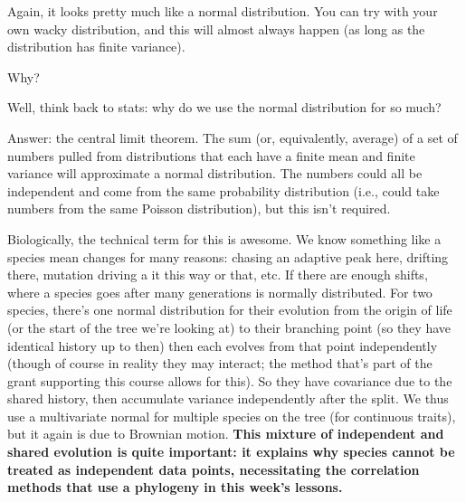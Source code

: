 \documentclass[]{book}
\theoremstyle{definition}
\theoremstyle{definition}
\theoremstyle{remark}
\begin{document}
Again, it looks pretty much like a normal distribution. You can try with
your own wacky distribution, and this will almost always happen (as long
as the distribution has finite variance).

Why?

Well, think back to stats: why do we use the normal distribution for so
much?

Answer: the central limit theorem. The sum (or, equivalently, average)
of a set of numbers pulled from distributions that each have a finite
mean and finite variance will approximate a normal distribution. The
numbers could all be independent and come from the same probability
distribution (i.e., could take numbers from the same Poisson
distribution), but this isn't required.

Biologically, the technical term for this is awesome. We know something
like a species mean changes for many reasons: chasing an adaptive peak
here, drifting there, mutation driving a it this way or that, etc. If
there are enough shifts, where a species goes after many generations is
normally distributed. For two species, there's one normal distribution
for their evolution from the origin of life (or the start of the tree
we're looking at) to their branching point (so they have identical
history up to then) then each evolves from that point independently
(though of course in reality they may interact; the method that's part
of the grant supporting this course allows for this). So they have
covariance due to the shared history, then accumulate variance
independently after the split. We thus use a multivariate normal for
multiple species on the tree (for continuous traits), but it again is
due to Brownian motion. \textbf{This mixture of independent and shared
evolution is quite important: it explains why species cannot be treated
as independent data points, necessitating the correlation methods that
use a phylogeny in this week's lessons.}
\end{document}
